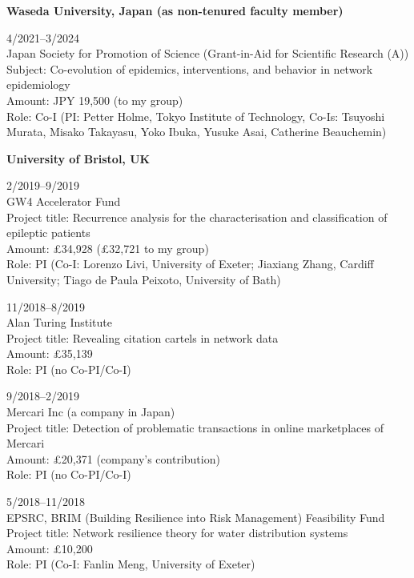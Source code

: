 \documentclass[11pt,letter]{article}
\renewenvironment{itemize}{
  \begin{list}{}{
    \setlength{\leftmargin}{1.5em}
    \setlength{\itemsep}{0.25em}
    \setlength{\parskip}{0pt}
    \setlength{\parsep}{0.25em}
  }
}{
  \end{list}
}
\begin{document}
\begin{itemize}
\item \textbf{Waseda University, Japan (as non-tenured faculty member)}

\item 4/2021--3/2024\\
Japan Society for Promotion of Science (Grant-in-Aid for Scientific Research (A))\\
Subject: Co-evolution of epidemics, interventions, and behavior in network epidemiology\\
Amount: JPY 19,500 (to my group)\\ %
Role: Co-I  (PI: Petter Holme, Tokyo Institute of Technology, Co-Is: Tsuyoshi Murata, Misako Takayasu, Yoko Ibuka, Yusuke Asai, Catherine Beauchemin)

\item \textbf{University of Bristol, UK}



\item
2/2019--9/2019\\
GW4 Accelerator Fund\\
Project title: Recurrence analysis for the characterisation and classification of epileptic patients\\
Amount: \pounds 34,928 (\pounds 32,721 to my group)\\
Role: PI (Co-I: Lorenzo Livi, University of Exeter; Jiaxiang Zhang, Cardiff University; Tiago de Paula Peixoto, University of Bath)

\item 11/2018--8/2019\\ %
Alan Turing Institute\\
Project title: Revealing citation cartels in network data\\
Amount: \pounds 35,139\\
Role: PI (no Co-PI/Co-I)

\item 9/2018--2/2019\\
Mercari Inc (a company in Japan)\\
Project title: Detection of problematic transactions in online marketplaces of Mercari\\
Amount: \pounds 20,371 (company's contribution)\\
Role: PI (no Co-PI/Co-I)

\item 5/2018--11/2018\\
EPSRC, BRIM (Building Resilience into Risk Management) Feasibility Fund\\
Project title: Network resilience theory for water distribution systems\\
Amount: \pounds 10,200\\
Role: PI (Co-I: Fanlin Meng, University of Exeter)


\end{itemize}
\end{document}
